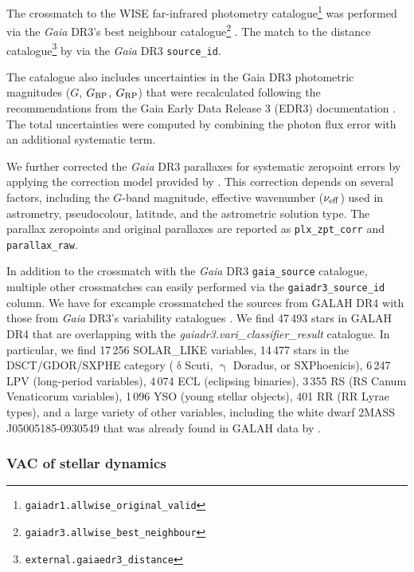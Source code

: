 \documentclass[
  journal=pasa,
  manuscript=research-paper, %
  year=2024,
  volume=37
]{cup-journal}
\newcommand{\Gaia}{\textit{Gaia}\xspace}
\begin{document}
The crossmatch to the WISE far-infrared photometry catalogue\footnote{\texttt{gaiadr1.allwise\_original\_valid}} \citep{Cutri2013} was performed via the \Gaia DR3's best neighbour catalogue\footnote{\texttt{gaiadr3.allwise\_best\_neighbour}} \citep{Torra2021}. The match to the distance catalogue\footnote{\texttt{external.gaiaedr3\_distance}} by \citet{BailerJones2021}  via the \Gaia DR3 \texttt{source\_id}.

The catalogue also includes uncertainties in the Gaia DR3 photometric magnitudes (\(G\), \(G_{\rm BP}\), \(G_{\rm RP}\)) that were recalculated following the recommendations from the Gaia Early Data Release 3 (EDR3) documentation \citep{Riello2021}. The total uncertainties were computed by combining the photon flux error with an additional systematic term.

We further corrected the \Gaia DR3 parallaxes for systematic zeropoint errors by applying the correction model provided by \citet{Lindegren2021b}. This correction depends on several factors, including the \(G\)-band magnitude, effective wavenumber (\(\nu_{\rm eff}\)) used in astrometry, pseudocolour, latitude, and the astrometric solution type. The parallax zeropoints and original parallaxes are reported as \texttt{plx\_zpt\_corr} and \texttt{parallax\_raw}.

In addition to the crossmatch with the \Gaia DR3 \texttt{gaia\_source} catalogue, multiple other crossmatches can easily performed via the \texttt{gaiadr3\_source\_id} column. We have for excample crossmatched the sources from GALAH DR4 with those from \Gaia DR3's variability catalogues \citep{Rimoldini2023}. We find 47\,493 stars in GALAH DR4 that are overlapping with the \textit{gaiadr3.vari\_classifier\_result} catalogue. In particular, we find 17\,256 SOLAR\_LIKE variables, 14\,477 stars in the DSCT/GDOR/SXPHE category ({$\updelta$}Scuti, {$\upgamma$} Doradus, or SXPhoenicis), 6\,247 LPV (long-period variables), 4\,074 ECL (eclipsing binaries), 3\,355 RS (RS Canum Venaticorum variables), 1\,096 YSO (young stellar objects), 401 RR (RR Lyrae types), and a large variety of other variables, including the white dwarf 2MASS J05005185-0930549 that was already found in GALAH data by \citet{Kawka2020}.

\subsubsection{VAC of stellar dynamics}
\label{sec:vac_dynamics}
\end{document}

